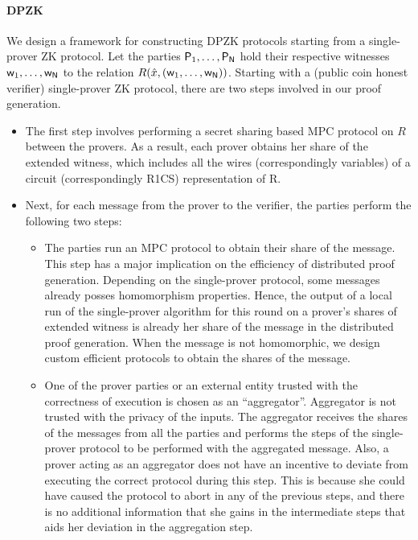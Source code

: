 \paragraph{DPZK}
We design a framework for constructing DPZK protocols starting from a single-prover ZK protocol.
Let the parties $\mathsf{P}_1, \ldots, \mathsf{P}_{\mathsf{N}}$ hold their respective witnesses $\mathsf{w}_1, \ldots, \mathsf{w}_{\mathsf{N}}$ to the relation $R(\hat{x}, (\mathsf{w}_1, \ldots,\mathsf{w}_{\mathsf{N}}))$. 
Starting with a (public coin honest verifier) single-prover ZK protocol, there are two steps involved in our proof generation.
\begin{itemize}
\item The first step involves performing a secret sharing based MPC protocol on $R$ between the provers. As a result, each prover obtains her share of the extended witness, which includes all the wires (correspondingly variables) of a circuit (correspondingly R1CS) representation of R. 
\item Next, for each message from the prover to the verifier, the parties perform the following two steps:
\begin{itemize}
\item The parties run an MPC protocol to obtain their share of the message. This step has a major implication on the efficiency of distributed proof generation. Depending on the single-prover protocol, some messages already posses homomorphism properties. Hence, the output of a local run of the single-prover algorithm for this round on a prover's shares of extended witness is already her share of the message in the distributed proof generation. When the message is not homomorphic, we design custom efficient protocols to obtain the shares of the message.
\item One of the prover parties or an external entity trusted with the correctness of execution is chosen as an ``aggregator''. Aggregator is not trusted with the privacy of the inputs. The aggregator receives the shares of the messages from all the parties and performs the steps of the single-prover protocol to be performed with the aggregated message. Also, a prover acting as an aggregator does not have an incentive to deviate from executing the correct protocol during this step. This is because she could have caused the protocol to abort in any of the previous steps, and there is no additional information that she gains in the intermediate steps that aids her deviation in the aggregation step.
\end{itemize}
\end{itemize}

